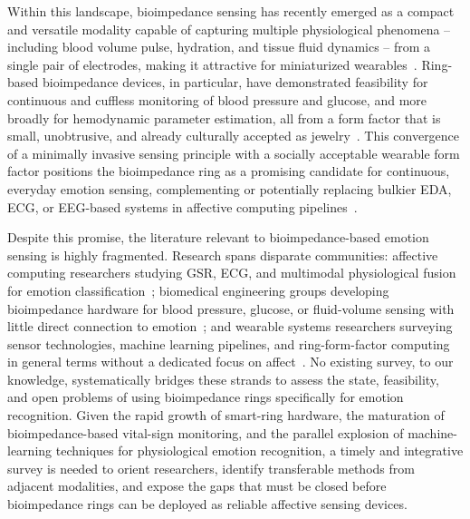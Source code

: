 Within this landscape, bioimpedance sensing has recently emerged as a compact and versatile modality capable of capturing multiple physiological phenomena -- including blood volume pulse, hydration, and tissue fluid dynamics -- from a single pair of electrodes, making it attractive for miniaturized wearables~\cite{jacobs2026advancing,noori2025sensitivity}. Ring-based bioimpedance devices, in particular, have demonstrated feasibility for continuous and cuffless monitoring of blood pressure and glucose, and more broadly for hemodynamic parameter estimation, all from a form factor that is small, unobtrusive, and already culturally accepted as jewelry~\cite{sel2023continuous,sanai2021evaluation,lindstrom2025wearable}. This convergence of a minimally invasive sensing principle with a socially acceptable wearable form factor positions the bioimpedance ring as a promising candidate for continuous, everyday emotion sensing, complementing or potentially replacing bulkier EDA, ECG, or EEG-based systems in affective computing pipelines~\cite{wang2025computing,sabry2022machine}.

Despite this promise, the literature relevant to bioimpedance-based emotion sensing is highly fragmented. Research spans disparate communities: affective computing researchers studying GSR, ECG, and multimodal physiological fusion for emotion classification~\cite{liu2018human,cimtay2020cross,pant2023phymer}; biomedical engineering groups developing bioimpedance hardware for blood pressure, glucose, or fluid-volume sensing with little direct connection to emotion~\cite{sel2023continuous,sanai2021evaluation,noori2025sensitivity}; and wearable systems researchers surveying sensor technologies, machine learning pipelines, and ring-form-factor computing in general terms without a dedicated focus on affect~\cite{wang2025computing,sabry2022machine,dias2018wearable}. No existing survey, to our knowledge, systematically bridges these strands to assess the state, feasibility, and open problems of using bioimpedance rings specifically for emotion recognition. Given the rapid growth of smart-ring hardware, the maturation of bioimpedance-based vital-sign monitoring, and the parallel explosion of machine-learning techniques for physiological emotion recognition, a timely and integrative survey is needed to orient researchers, identify transferable methods from adjacent modalities, and expose the gaps that must be closed before bioimpedance rings can be deployed as reliable affective sensing devices.

